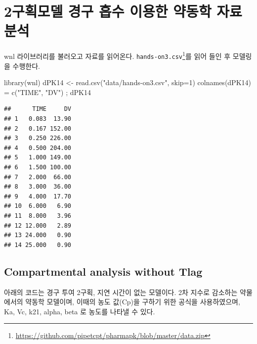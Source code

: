 \documentclass[
  11pt,
  krantz2, a4paper, twoside]{krantz}
\newenvironment{Shaded}{\begin{snugshade}}{\end{snugshade}}
\newcommand{\AttributeTok}[1]{\textcolor[rgb]{0.77,0.63,0.00}{#1}}
\newcommand{\DecValTok}[1]{\textcolor[rgb]{0.00,0.00,0.81}{#1}}
\newcommand{\FunctionTok}[1]{\textcolor[rgb]{0.00,0.00,0.00}{#1}}
\newcommand{\NormalTok}[1]{#1}
\newcommand{\OtherTok}[1]{\textcolor[rgb]{0.56,0.35,0.01}{#1}}
\newcommand{\StringTok}[1]{\textcolor[rgb]{0.31,0.60,0.02}{#1}}
\theoremstyle{definition}
\theoremstyle{definition}
\theoremstyle{definition}
\theoremstyle{definition}
\theoremstyle{remark}
\begin{document}
\hypertarget{uxad6cuxd68duxbaa8uxb378-uxacbduxad6c-uxd761uxc218-uxc774uxc6a9uxd55c-uxc57duxb3d9uxd559-uxc790uxb8cc-uxbd84uxc11d}{%
\section{\texorpdfstring{2구획모델 경구 흡수 이용한 약동학 자료 분석}{2구획모델 경구 흡수 이용한 약동학 자료 분석}}\label{uxad6cuxd68duxbaa8uxb378-uxacbduxad6c-uxd761uxc218-uxc774uxc6a9uxd55c-uxc57duxb3d9uxd559-uxc790uxb8cc-uxbd84uxc11d}}

wnl 라이브러리를 불러오고 자료를 읽어온다.
\texttt{hands-on3.csv}\footnote{\url{https://github.com/pipetcpt/pharmapk/blob/master/data.zip}}를 읽어 들인 후 모델링을 수행한다.

\begin{Shaded}
\begin{Highlighting}[]
\FunctionTok{library}\NormalTok{(wnl)}
\NormalTok{dPK14 }\OtherTok{\textless{}{-}} \FunctionTok{read.csv}\NormalTok{(}\StringTok{"data/hands{-}on3.csv"}\NormalTok{, }\AttributeTok{skip=}\DecValTok{1}\NormalTok{)}
\FunctionTok{colnames}\NormalTok{(dPK14) }\OtherTok{=} \FunctionTok{c}\NormalTok{(}\StringTok{"TIME"}\NormalTok{, }\StringTok{"DV"}\NormalTok{) ; dPK14}
\end{Highlighting}
\end{Shaded}

\begin{verbatim}
##      TIME     DV
## 1   0.083  13.90
## 2   0.167 152.00
## 3   0.250 226.00
## 4   0.500 204.00
## 5   1.000 149.00
## 6   1.500 100.00
## 7   2.000  66.00
## 8   3.000  36.00
## 9   4.000  17.70
## 10  6.000   6.90
## 11  8.000   3.96
## 12 12.000   2.89
## 13 24.000   0.90
## 14 25.000   0.90
\end{verbatim}

\hypertarget{compartmental-analysis-without-tlag-1}{%
\subsection{Compartmental analysis without Tlag}\label{compartmental-analysis-without-tlag-1}}

아래의 코드는 경구 투여 2구획, 지연 시간이 없는 모델이다. 
2차 지수로 감소하는 약물에서의 약동학 모델이며, 이때의 농도 값(Cp)을 구하기 위한 공식을 사용하였으며, Ka, Vc, k21, alpha, beta 로 농도를 나타낼 수 있다.
\end{document}
